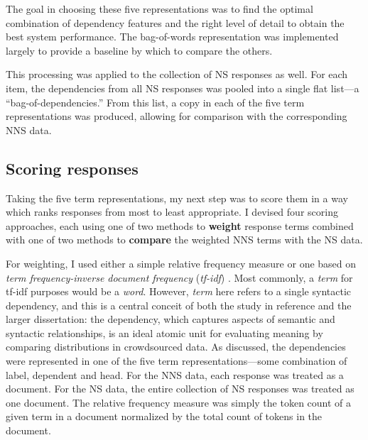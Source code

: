 The goal in choosing these five representations was to find the optimal combination of dependency features and the right level of detail to obtain the best system performance. The bag-of-words representation was implemented largely to provide a baseline by which to compare the others.

This processing was applied to the collection of NS responses as well. For each item, the dependencies from all NS responses was pooled into a single flat list---a ``bag-of-dependencies.'' From this list, a copy in each of the five term representations was produced, allowing for comparison with the corresponding NNS data.


\subsection{Scoring responses}
\label{sec:scoring}

Taking the five term representations, my next
step was to score them in a way which ranks responses from most to
least appropriate.  I devised four scoring approaches, each
using one of two methods to \textbf{weight} response terms combined
with one of two methods to \textbf{compare} the weighted NNS terms
with the NS data.

For weighting, I used either a simple relative frequency measure
or one based on \textit{term frequency-inverse document frequency} (\textit{tf-idf})
\citep[][ch. 6]{manning-et-al:08}. Most commonly, a \textit{term} for tf-idf purposes would be a \textit{word}. However, \textit{term} here refers to a single syntactic dependency, and this is a central conceit of both the study in reference and the larger dissertation:  the dependency, which captures aspects of semantic and syntactic relationships, is an ideal atomic unit for evaluating meaning by comparing distributions in crowdsourced data. As discussed, the dependencies were represented in one of the five term representations---some combination of label, dependent and head. For the NNS data, each response was treated as a document. For the NS data, the entire collection of NS responses was treated as one document. The relative frequency measure was simply the token count of a given term in a document normalized by the total count of tokens in the document.

